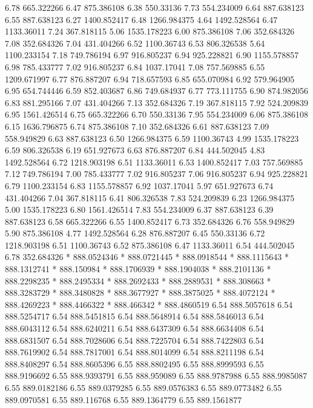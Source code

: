 6.78 	665.322266
6.47 	875.386108
6.38 	550.33136
7.73 	554.234009
6.64 	887.638123
6.55 	887.638123
6.27 	1400.852417
6.48 	1266.984375
4.64 	1492.528564
6.47 	1133.36011
7.24 	367.818115
5.06 	1535.178223
6.00 	875.386108
7.06 	352.684326
7.08 	352.684326
7.04 	431.404266
6.52 	1100.36743
6.53 	806.326538
5.64 	1100.233154
7.18 	749.786194
6.97 	916.805237
6.94 	925.228821
6.90 	1155.578857
6.98 	785.433777
7.02 	916.805237
6.84 	1037.17041
7.08 	757.569885
6.55 	1209.671997
6.77 	876.887207
6.94 	718.657593
6.85 	655.070984
6.92 	579.964905
6.95 	654.744446
6.59 	852.403687
6.86 	749.684937
6.77 	773.111755
6.90 	874.982056
6.83 	881.295166
7.07 	431.404266
7.13 	352.684326
7.19 	367.818115
7.92 	524.209839
6.95 	1561.426514
6.75 	665.322266
6.70 	550.33136
7.95 	554.234009
6.06 	875.386108
6.15 	1636.796875
6.74 	875.386108
7.10 	352.684326
6.61 	887.638123
7.09 	558.949829
6.63 	887.638123
6.50 	1266.984375
6.59 	1100.36743
4.99 	1535.178223
6.59 	806.326538
6.19 	651.927673
6.63 	876.887207
6.84 	444.502045
4.83 	1492.528564
6.72 	1218.903198
6.51 	1133.36011
6.53 	1400.852417
7.03 	757.569885
7.12 	749.786194
7.00 	785.433777
7.02 	916.805237
7.06 	916.805237
6.94 	925.228821
6.79 	1100.233154
6.83 	1155.578857
6.92 	1037.17041
5.97 	651.927673
6.74 	431.404266
7.04 	367.818115
6.41 	806.326538
7.83 	524.209839
6.23 	1266.984375
5.00 	1535.178223
6.80 	1561.426514
7.83 	554.234009
6.37 	887.638123
6.39 	887.638123
6.58 	665.322266
6.55 	1400.852417
6.73 	352.684326
6.76 	558.949829
5.90 	875.386108
4.77 	1492.528564
6.28 	876.887207
6.45 	550.33136
6.72 	1218.903198
6.51 	1100.36743
6.52 	875.386108
6.47 	1133.36011
6.54 	444.502045
6.78 	352.684326
*	888.0524346
*	888.0721445
*	888.0918544
*	888.1115643
*	888.1312741
*	888.150984
*	888.1706939
*	888.1904038
*	888.2101136
*	888.2298235
*	888.2495334
*	888.2692433
*	888.2889531
*	888.308663
*	888.3283729
*	888.3480828
*	888.3677927
*	888.3875025
*	888.4072124
*	888.4269223
*	888.4466322
*	888.466342
*	888.4860519
6.54 	888.5057618
6.54 	888.5254717
6.54 	888.5451815
6.54 	888.5648914
6.54 	888.5846013
6.54 	888.6043112
6.54 	888.6240211
6.54 	888.6437309
6.54 	888.6634408
6.54 	888.6831507
6.54 	888.7028606
6.54 	888.7225704
6.54 	888.7422803
6.54 	888.7619902
6.54 	888.7817001
6.54 	888.8014099
6.54 	888.8211198
6.54 	888.8408297
6.54 	888.8605396
6.55 	888.8802495
6.55 	888.8999593
6.55 	888.9196692
6.55 	888.9393791
6.55 	888.959089
6.55 	888.9787988
6.55 	888.9985087
6.55 	889.0182186
6.55 	889.0379285
6.55 	889.0576383
6.55 	889.0773482
6.55 	889.0970581
6.55 	889.116768
6.55 	889.1364779
6.55 	889.1561877
